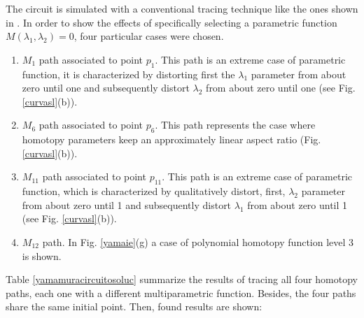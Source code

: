 \documentclass[conference,letterpaper,twocolumn]{IEEEtran}
\begin{document}
The circuit is simulated with a conventional tracing technique like the ones shown in  \cite{homo_allgower,homo_iberchip03}. In order to show the effects of specifically selecting a parametric function $M(\lambda_1,\lambda_2)=0$, four particular cases were chosen.

\begin{enumerate}
\item $M_1$ path associated to point $p_1$. This path is an extreme case of parametric function, it is characterized by distorting first the $\lambda_1$ parameter from about zero until one and subsequently distort $\lambda_2$ from about zero until one (see Fig. \ref{curvasl}(b)).
\item $M_6$ path associated to point $p_6$. This path represents the case where homotopy parameters keep an approximately  linear aspect ratio (Fig. \ref{curvasl}(b)).
\item $M_{11}$ path associated to point $p_{11}$. This path is an extreme case of parametric function, which is characterized by qualitatively distort, first, $\lambda_2$ parameter from about zero until 1 and subsequently distort $\lambda_1$ from about zero until 1 (see Fig. \ref{curvasl}(b)).
\item $M_{12}$ path. In Fig. \ref{yamaie}(g) a case of polynomial homotopy function level 3 is shown.
\end{enumerate}

Table \ref{yamamuracircuitosoluc} summarize the results of tracing all four homotopy paths, each one with a different multiparametric function. Besides, the four paths share the same initial point. Then, found results are shown:
\end{document}
